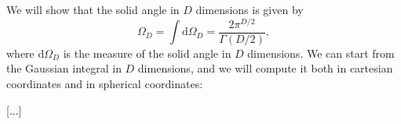 \begin{example}
    We will show that the solid angle in \(D\) dimensions is given by
    \[
        \Omega_D = \int \mathrm{d} \Omega_D = \frac{2 \pi^{D/2}}{\Gamma(D/2)},
    \]
    where \(\mathrm{d} \Omega_D\) is the measure of the solid angle in \(D\) dimensions. We can start from the Gaussian integral in \(D\) dimensions, and we will compute it both in cartesian coordinates and in spherical coordinates:

    [...]

\end{example}
